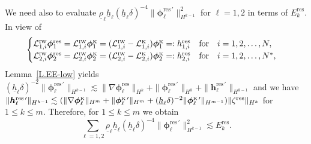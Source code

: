 \documentclass[11pt,leqno]{article}
\numberwithin{equation}{section}
\numberwithin{figure}{section}
\begin{document}
%
We need also to evaluate $\underline{\rho}_\ell\underline{h}_\ell(\underline{h}_\ell\delta)^{-4}
\|\bm{\phi}_\ell^{\mathrm{res} \, \prime}\|_{H^{k-1}}^2$ for $\ell=1,2$ in terms of $E_k^\mathrm{res}$. 
In view of 
%
\[
\begin{cases}
 \mathcal{L}_{1,i}^{\mbox{\rm\tiny IW}} \bm{\phi}_1^\mathrm{res}
  =  \mathcal{L}_{1,i}^{\mbox{\rm\tiny IW}} \bm{\phi}_1^{\mbox{\rm\tiny K}}
  = (\mathcal{L}_{1,i}^{\mbox{\rm\tiny IW}}-\mathcal{L}_{1,i}^{\mbox{\rm\tiny K}})\bm{\phi}_1^{\mbox{\rm\tiny K}}
  =: h_{1,i}^\mathrm{res}
   \quad\mbox{for}\quad i=1,2,\ldots,N, \\
 \mathcal{L}_{2,i}^{\mbox{\rm\tiny IW}} \bm{\phi}_2^\mathrm{res}
  = \mathcal{L}_{2,i}^{\mbox{\rm\tiny IW}} \bm{\phi}_2^{\mbox{\rm\tiny K}}
  = (\mathcal{L}_{2,i}^{\mbox{\rm\tiny IW}}-\mathcal{L}_{2,i}^{\mbox{\rm\tiny K}})\bm{\phi}_2^{\mbox{\rm\tiny K}}
  =: h_{2,i}^\mathrm{res}
   \quad\mbox{for}\quad i=1,2,\ldots,N^*, 
\end{cases}
\]
%
Lemma~\ref{L.EE-low} yields 
$(\underline{h}_\ell\delta)^{-2} \|\bm{\phi}_\ell^{\mathrm{res} \, \prime}\|_{H^{k-1}}
\lesssim \|\nabla\bm{\phi}_\ell^\mathrm{res}\|_{H^k} + \|\bm{\phi}_\ell^{\mathrm{res} \, \prime} \|_{H^{k}}
 + \|\bm{h}_\ell^{\mathrm{res} \, \prime}\|_{H^{k-1}}$ and we have 
$\|\bm{h}_\ell^{\mathrm{res} \, \prime}\|_{H^{k-1}} \lesssim 
 (\|\nabla\bm{\phi}_\ell^{\mbox{\rm\tiny K}}\|_{H^m} + \|\bm{\phi}_\ell^{\mbox{\rm\tiny K} \, \prime}\|_{H^m}
  + (\underline{h}_\ell\delta)^{-2}\|\bm{\phi}_\ell^{\mbox{\rm\tiny K} \, \prime}\|_{H^{m-1}})
  \|\zeta^\mathrm{res}\|_{H^k}$ for $1\leq k\leq m$. 
Therefore, for $1\leq k\leq m$ we obtain
%
\begin{equation}\label{estimate-low-res}
\sum_{\ell=1,2}\underline{\rho}_\ell \underline{h}_\ell
 (\underline{h}_\ell\delta)^{-4}\|\bm{\phi}_\ell^{\mathrm{res} \, \prime}\|_{H^{k-1}}^2
 \lesssim E_k^\mathrm{res}.
\end{equation}
\end{document}

